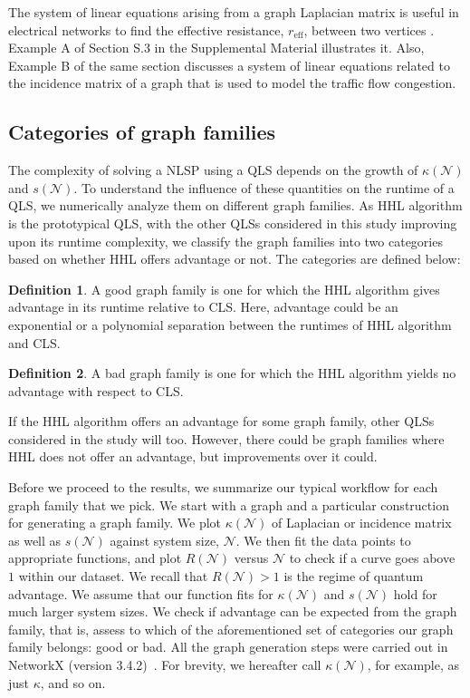\documentclass[%
 reprint,
 superscriptaddress,
 amsmath,amssymb,
 aps,
 pra,
floatfix,
nofootinbib,
]{revtex4-2}
\theoremstyle{definition}
\newtheorem{definition}{Definition}[section]
\theoremstyle{remark}
\begin{document}
The system of linear equations arising from a graph Laplacian matrix is useful in electrical networks to find the effective resistance, $r_\text{eff}$, between two vertices \cite{spielman2010algorithms}. Example A of Section S.3 in the Supplemental Material illustrates it. Also, Example B of the same section discusses a system of linear equations related to the incidence matrix of a graph that is used to model the traffic flow congestion. 

\subsection{Categories of graph families} 

The complexity of solving a NLSP using a QLS depends on the growth of $\kappa(\mathcal{N})$ and $s(\mathcal{N})$. To understand the influence of these quantities on the runtime of a QLS, we numerically analyze them on different graph families. As HHL algorithm is the prototypical QLS, with the other QLSs considered in this study improving upon its runtime complexity, we classify the graph families into two categories based on whether HHL offers advantage or not. The categories are defined below: 

\begin{definition} \label{def:good} 
A good graph family is one for which the HHL algorithm gives advantage in its runtime relative to CLS. Here, advantage could be an exponential or a polynomial separation between the runtimes of HHL algorithm and CLS.
\end{definition} 



\begin{definition} \label{def:bad}
A bad graph family is one for which the HHL algorithm yields no advantage with respect to CLS. 
\end{definition} 

If the HHL algorithm offers an advantage for some graph family, other QLSs considered in the study will too. However, there could be graph families where HHL does not offer an advantage, but improvements over it could. 

Before we proceed to the results, we summarize our typical workflow for each graph family that we pick. We start with a graph and a particular construction for generating a graph family. We plot $\kappa(\mathcal{N})$ of Laplacian or incidence matrix as well as $s(\mathcal{N})$ against system size, $\mathcal{N}$. We then fit the data points to appropriate functions, and plot $R(\mathcal{N})$ versus $\mathcal{N}$ to check if a curve goes above $1$ within our dataset. We recall that $R(\mathcal{N})>1$ is the regime of quantum advantage. We assume that our function fits for $\kappa(\mathcal{N})$ and $s(\mathcal{N})$ hold for much larger system sizes. We check if advantage can be expected from the graph family, that is, assess to which of the aforementioned set of categories our graph family belongs: good or bad. All the graph generation steps were carried out in NetworkX (version 3.4.2)~\cite{networkx}. For brevity, we hereafter call $\kappa(\mathcal{N})$, for example, as just $\kappa$, and so on. 
\end{document}
